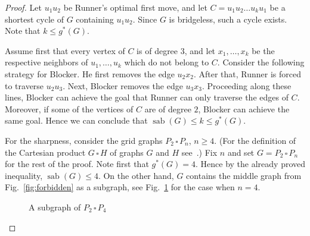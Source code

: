 \documentclass[12pt]{article}
\newcommand{\cp}{\,\square\,}
\DeclareMathOperator{\sab}{\mathrm{sab}}
\begin{document}
\begin{proof}
Let $u_1u_2$ be Runner's optimal first move, and let $C = u_1u_2\ldots u_ku_1$ be a shortest cycle of $G$ containing $u_1u_2$. Since $G$ is bridgeless, such a cycle exists. Note that $k\le g^\ast(G)$. 

Assume first that every vertex of $C$ is of degree $3$, and let $x_1, \dots, x_k$ be the respective neighbors of $u_1, \dots, u_k$ which do not belong to $C$. Consider the following strategy for Blocker. He first removes the edge $u_2x_2$. After that, Runner is forced to traverse $u_2u_3$. Next, Blocker removes the edge $u_3x_3$. Proceeding along these lines, Blocker can achieve the goal that Runner can only traverse the edges of $C$. Moreover, if some of the vertices of $C$ are of degree $2$, Blocker can achieve the same goal. Hence we can conclude that $\sab(G) \le k \le g^\ast(G)$.

For the sharpness, consider the grid graphs $P_2\cp P_n$, $n\ge 4$. (For the definition of the Cartesian product $G\cp H$ of graphs $G$ and $H$ see~\cite{hammack-2011}.) Fix $n$ and set $G = P_2\cp P_n$ for the rest of the proof. Note first that $g^\ast(G) = 4$. Hence by the already proved inequality, $\sab(G) \le 4$. On the other hand, $G$ contains the middle graph from Fig.~\ref{fig:forbidden} as a subgraph, see Fig.~\ref{fig:p2-4-subgraph} for the case when $n=4$. 

\begin{figure}[ht!]
    \centering
{}
\caption{A subgraph of $P_2\cp P_4$}
\label{fig:p2-4-subgraph}
\end{figure}


\end{proof}
\end{document}
